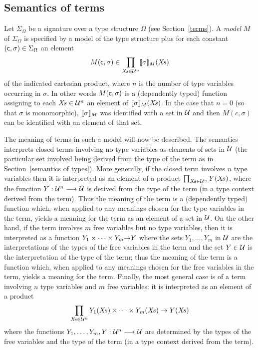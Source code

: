 \subsection{Semantics of terms}
\label{semantics of terms}

Let $\Sigma_{\Omega}$ be a signature over a type
structure $\Omega$ (see Section~\ref{terms}). A {\em model\/} $M$ of
$\Sigma_{\Omega}$ is specified by a model of the type structure plus
for each constant $({\sf c},\sigma)\in\Sigma_{\Omega}$ an
element
\[
M({\sf c},\sigma) \in
\prod_{X\!s\in{\cal U}^{n}}[\![\sigma]\!]_{M}(X\!s)
\]
of the indicated cartesian product, where $n$ is the number of type
variables occurring in $\sigma$. In other words
$M({\sf c},\sigma)$ is a (dependently typed) function
assigning to each $X\!s\in{\cal U}^{n}$ an element of
$[\![\sigma]\!]_{M}(X\!s)$. In the case that $n=0$ (so that
$\sigma$ is monomorphic), $[\![\sigma]\!]_{M}$ was identified
with a set in $\cal U$ and then $M(c,\sigma)$ can be
identified with an element of that set.

The meaning of \HOL{} terms in such a model will now be described. The
semantics interprets closed terms involving no type variables as
elements of sets in $\cal U$ (the particular set involved being derived
from the type of the term as in Section~\ref{semantics of types}). More
generally, if the closed term involves $n$ type variables then it is
interpreted as an element of a product $\prod_{X\!s\in{\cal
U}^{n}}Y(X\!s)$, where the function $Y:{\cal U}^{n}\longrightarrow{\cal
U}$ is derived from the type of the term (in a type context derived
from the term). Thus the meaning of the term is a (dependently typed)
function which, when applied to any meanings chosen for the type
variables in the term, yields a meaning for the term as an element of a
set in $\cal U$. On the other hand, if the term involves $m$ free
variables but no type variables, then it is interpreted as a function
$Y_1\times\cdots\times Y_m{\to} Y$ where the sets $Y_1,\ldots,Y_m$ in
$\cal U$ are the interpretations of the types of the free variables in
the term and the set $Y\in{\cal U}$ is the interpretation of the type
of the term; thus the meaning of the term is a function which, when
applied to any meanings chosen for the free variables in the term,
yields a meaning for the term. Finally, the most general case is of a
term involving $n$ type variables and $m$ free variables: it is
interpreted as an element of a product
\[
\prod_{X\!s\in{\cal
U}^{n}}Y_{1}(X\!s)\times\cdots\times Y_{m}(X\!s) \;{\to}\; Y(X\!s)
\]
where the functions $Y_{1},\ldots,Y_{m},Y:{\cal
U}^{n}\longrightarrow{\cal U}$ are determined by the types of the free
variables and the type of the term (in a type context derived from the
term).

